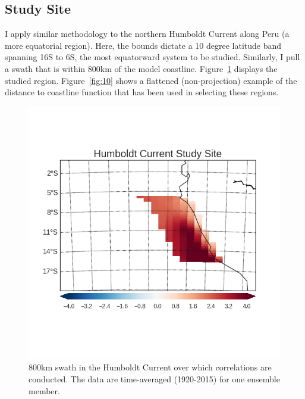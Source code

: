 \documentclass[12pt]{article}
\begin{document}
\subsection{Study Site}
I apply similar methodology to the northern Humboldt Current along Peru (a more equatorial region). Here, the \citet{Chavez:2009} bounds dictate a 10 degree latitude band spanning 16S to 6S, the most equatorward system to be studied. Similarly, I pull a swath that is within 800km of the model coastline. Figure~\ref{fig:9} displays the studied region. Figure~\ref{fig:10} shows a flattened (non-projection) example of the distance to coastline function that has been used in selecting these regions.
\begin{figure}[!h]
	\centering
	\includegraphics[width=29pc]{../../figs/humcs/study-site/humboldt-current-study-site.png}
	\caption{800km swath in the Humboldt Current over which correlations are conducted. The data are time-averaged (1920-2015) for one ensemble member.}
	\label{fig:9}
\end{figure}
\end{document}
